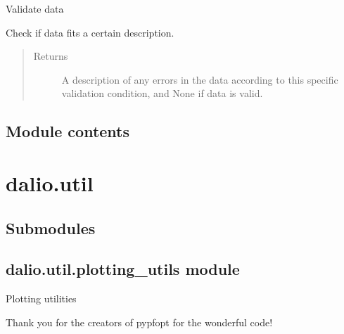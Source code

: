 \documentclass[letterpaper,10pt,english]{sphinxmanual}
\begin{document}
\begin{fulllineitems}
\begin{fulllineitems}
\label{\detokenize{dalio.validator:dalio.validator.validator.Validator.validate}}
Validate data

Check if data fits a certain description.
\begin{quote}\begin{description}
\item[{Returns}] \leavevmode
A description of any errors in the data according to this
specific validation condition, and None if data is valid.

\end{description}\end{quote}

\end{fulllineitems}


\end{fulllineitems}



\section{Module contents}
\label{\detokenize{dalio.validator:module-dalio.validator}}\label{\detokenize{dalio.validator:module-contents}}

\chapter{dalio.util}
\label{\detokenize{dalio.util:dalio-util}}\label{\detokenize{dalio.util::doc}}

\section{Submodules}
\label{\detokenize{dalio.util:submodules}}

\section{dalio.util.plotting\_utils module}
\label{\detokenize{dalio.util:module-dalio.util.plotting_utils}}\label{\detokenize{dalio.util:dalio-util-plotting-utils-module}}
Plotting utilities

Thank you for the creators of pypfopt for the wonderful code!
\end{document}
